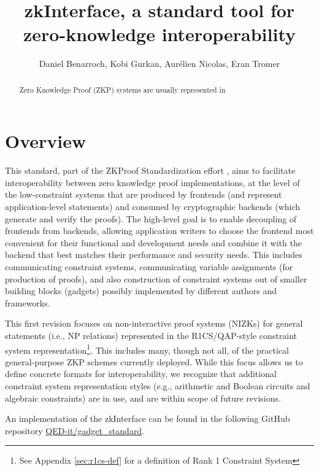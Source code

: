 \documentclass[a4paper,12pt]{article}
\title{zkInterface, a standard tool for zero-knowledge interoperability}
\author{Daniel Benarroch, Kobi Gurkan, Aurélien Nicolas, Eran Tromer}
\newcommand{\enote}[1]{\dtcolornote[Eran]{darkgreen}{#1}}
\begin{document}
\maketitle

\enote{Add abstract}
\begin{abstract}
Zero Knowledge Proof (ZKP) systems are usually represented in 
\end{abstract}

\tableofcontents
\section{Overview}
This standard, part of the ZKProof Standardization effort \cite{ZKProofSecurity, ZKProofImplementation, ZKProofApplications}, aims to facilitate interoperability between zero knowledge proof implementations, at the level of the low-constraint systems that are produced by frontends (and represent application-level statements) and consumed by cryptographic backends (which generate and verify the proofs). The high-level goal is to enable decoupling of frontends from backends, allowing application writers to choose the frontend most convenient for their functional and development needs and combine it with the backend that best matches their performance and security needs. This includes communicating constraint systems, communicating variable assignments (for production of proofs), and also construction of constraint systems out of smaller building blocks (gadgets) possibly implemented by different authors and frameworks.

This first revision focuses on non-interactive proof systems (NIZKs) for general statements (i.e., NP relations) represented in the R1CS/QAP-style constraint system representation\footnote{See Appendix \ref{sec:r1cs-def} for a definition of Rank 1 Constraint System}. This includes many, though not all, of the practical general-purpose ZKP schemes currently deployed. While this focus allows us to define concrete formats for interoperability, we recognize that additional constraint system representation styles (e.g., arithmetic and Boolean circuits and algebraic constraints) are in use, and are within scope of future revisions.

An implementation of the zkInterface can be found in the following GitHub repository \href{https://github.com/QED-it/gadget_standard}{QED-it/gadget\_standard}.
\end{document}
